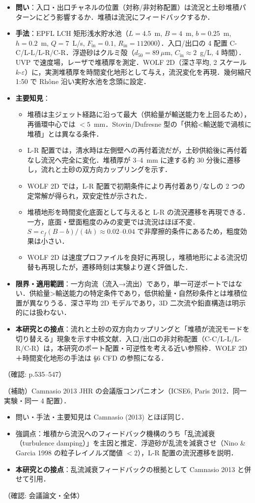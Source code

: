 \documentclass[11pt]{jsarticle}
\newcommand{\litref}[1]{{\large\bfseries\color{citecolor}#1}}
\begin{document}
\begin{itemize}
  \item \textbf{問い}：入口・出口チャネルの位置（対称/非対称配置）は流況と土砂堆積パターンにどう影響するか．堆積は流況にフィードバックするか．
  \item \textbf{手法}：EPFL LCH 矩形浅水貯水池（$L=4.5$~m, $B=4$~m, $b=0.25$~m, $h=0.2$~m, $Q=7$~L/s, $F_\mathrm{in}=0.1$, $R_\mathrm{in}=112000$）．入口/出口の 4 配置 C-C/L-L/L-R/C-R．浮遊砂はクルミ殻（$d_{50}=89~\mu$m, $C_\mathrm{in}\approx 2$~g/L, 4 時間）．UVP で速度場，レーザで堆積厚を測定．WOLF 2D（深さ平均, 2 スケール $k$-$\varepsilon$）に，実測堆積厚を時間変化地形として与え，流況変化を再現．幾何縮尺 1:50 で Rhône 沿い実貯水池を念頭に設定．
  \item \textbf{主要知見}：
  \begin{itemize}
    \item 堆積は主ジェット経路に沿って最大（供給量が輸送能力を上回るため），再循環中心では $<5$~mm．Stovin/Dufresne 型の「供給<輸送能で渦核に堆積」とは異なる条件．
    \item L-R 配置では，清水時は左側壁への再付着流だが，土砂供給後に再付着なし流況へ完全に変化．堆積厚が 3--4~mm に達する約 30 分後に遷移し，流れと土砂の双方向カップリングを示す．
    \item WOLF 2D では，L-R 配置で初期条件により再付着あり/なしの 2 つの定常解が得られ，双安定性が示された．
    \item 堆積地形を時間変化底面として与えると L-R の流況遷移を再現できる．一方，底面・壁面粗度のみの変更では流況はほぼ不変．$S=c_f(B-b)/(4h)\approx 0.02$--$0.04$ で非摩擦的条件にあるため，粗度効果は小さい．
    \item WOLF 2D は速度プロファイルを良好に再現し，堆積地形による流況切替も再現したが，遷移時刻は実験より遅く評価した．
  \end{itemize}
  \item \textbf{限界・適用範囲}：一方向流（流入→流出）であり，単一可逆ポートではない．供給量>輸送能力の特定条件であり，低供給量・自然砂条件とは堆積位置が異なりうる．深さ平均 2D モデルであり，3D 二次流や鉛直構造は明示的には扱わない．
  \item \textbf{本研究との接点}：流れと土砂の双方向カップリングと「堆積が流況モードを切り替える」現象を示す中核文献．入口/出口の非対称配置（C-C/L-L/L-R/C-R）は，本研究のポート配置・可逆性を考える近い参照枠．WOLF 2D＋時間変化地形の手法は §6 CFD の参照になる．
\end{itemize}
\noindent（確認: p.535--547）

\noindent\litref{Camnasio et al. (2012)}\quad（補助）Camnasio 2013 JHR の会議版コンパニオン（ICSE6, Paris 2012．同一実験・同一 4 配置）．
\begin{itemize}
  \item 問い・手法・主要知見は Camnasio (2013) とほぼ同じ．
  \item 強調点：堆積から流況へのフィードバック機構のうち「乱流減衰（turbulence damping）」を主因と推定．浮遊砂が乱流を減衰させ（Nino \& Garcia 1998 の粒子レイノルズ閾値 $<2$），L-R 配置の流況遷移を説明．
  \item \textbf{本研究との接点}：乱流減衰フィードバックの根拠として Camnasio 2013 と併せて引用．
\end{itemize}
\noindent（確認: 会議論文・全体）
\end{document}
